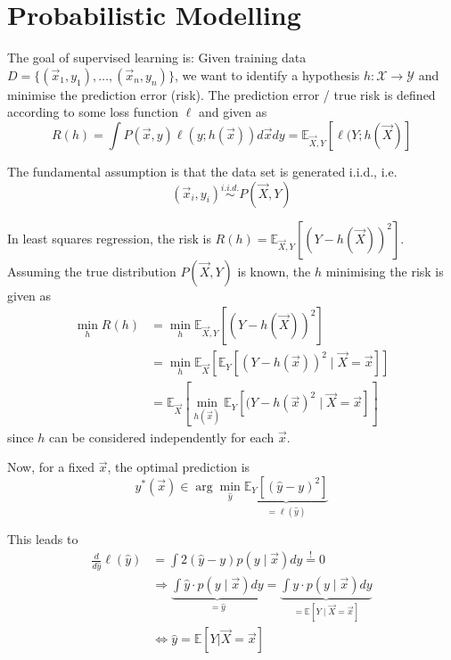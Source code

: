 \section{Probabilistic Modelling}
The goal of supervised learning is:
Given training data $D = \{(\vec{x}_1, y_1), \dotsc, (\vec{x}_n, y_n)\}$,
we want to identify a hypothesis $h : \mathcal{X} \to \mathcal{Y}$
and minimise the prediction error (risk).
The prediction error / true risk is
defined according to some loss function
$\ell$ and given as
\begin{equation*}
    R(h) = \int{P(\vec{x}, y) \ell(y; h(\vec{x})) d\vec{x} dy}
        = \mathbb{E}_{\vec{X}, Y}[\ell(Y; h(\vec{X})]
\end{equation*}

The fundamental assumption is that
the data set is generated i.i.d.,
i.e.
\begin{equation*}
    (\vec{x}_i, y_i) \overset{i.i.d.}{\sim} P(\vec{X}, Y)
\end{equation*}

In least squares regression,
the risk is
$R(h) = \mathbb{E}_{\vec{X}, Y}[(Y - h(\vec{X}))^2]$.
Assuming the true distribution $P(\vec{X}, Y)$ is known,
the $h$ minimising the risk is given as
\begin{align*}
    \min_h{R(h)}
    &= \min_h{\mathbb{E}_{\vec{X}, Y}[(Y - h(\vec{X}))^2]} \\
    &= \min_h{\mathbb{E}_{\vec{X}}[\mathbb{E}_Y[(Y - h(\vec{x}))^2 \mid \vec{X} = \vec{x}]]} \\
    &= \mathbb{E}_{\vec{X}}[
        \min_{h(\vec{x})}{\mathbb{E}_Y[(Y-h(\vec{x})^2 \mid \vec{X} = \vec{x}]}
    ]
\end{align*}
since $h$ can be considered independently for each $\vec{x}$.

Now, for a fixed $\vec{x}$, the optimal prediction is
\begin{equation*}
    y^*(\vec{x}) \in \arg\min_{\hat{y}}{
        \underbrace{\mathbb{E}_Y[(\hat{y} - y)^2]}_{= \ell(\hat{y})}
    }
\end{equation*}

This leads to
\begin{align*}
    \frac{d}{d \hat{y}} \ell(\hat{y}) &= \int{2 (\hat{y} - y) p(y \mid \vec{x}) dy} \overset{!}{=} 0 \\
    &\Rightarrow \underbrace{\int{\hat{y} \cdot p(y \mid \vec{x}) dy}}_{=\hat{y}} = \underbrace{\int{y \cdot p(y \mid \vec{x}) dy}}_{= \mathbb{E}[Y \mid \vec{X} = \vec{x}]} \\
    &\Leftrightarrow \hat{y} = \mathbb{E}[Y | \vec{X} = \vec{x}]
\end{align*}

